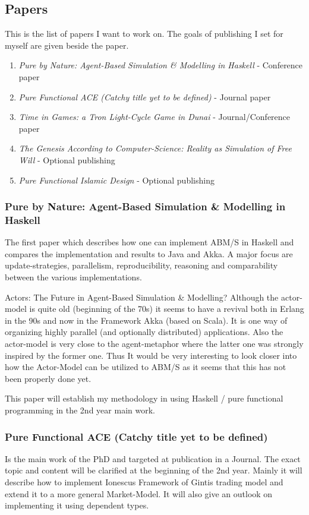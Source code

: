 \subsection{Papers}
This is the list of papers I want to work on. The goals of publishing I set for myself are given beside the paper.

\begin{enumerate}
\item \textit{Pure by Nature: Agent-Based Simulation \& Modelling in Haskell} - Conference paper
\item \textit{Pure Functional ACE (Catchy title yet to be defined)} - Journal paper
\item \textit{Time in Games: a Tron Light-Cycle Game in Dunai} - Journal/Conference paper
\item \textit{The Genesis According to Computer-Science: Reality as Simulation of Free Will} - Optional publishing
\item \textit{Pure Functional Islamic Design} - Optional publishing
\end{enumerate}

\subsubsection{Pure by Nature: Agent-Based Simulation \& Modelling in Haskell}
The first paper which describes how one can implement ABM/S in Haskell and compares the implementation and results to Java and Akka. A major focus are update-strategies, parallelism, reproducibility, reasoning and comparability between the various implementations. 

Actors: The Future in Agent-Based Simulation \& Modelling?
Although the actor-model is quite old (beginning of the 70s) it seems to have a revival both in Erlang in the 90s and now in the Framework Akka (based on Scala). It is one way of organizing highly parallel (and optionally distributed) applications. Also the actor-model is very close to the agent-metaphor where the latter one was strongly inspired by the former one. Thus It would be very interesting to look closer into how the Actor-Model can be utilized to ABM/S as it seems that this has not been properly done yet.

This paper will establish my methodology in using Haskell / pure functional programming in the 2nd year main work.

\subsubsection{Pure Functional ACE (Catchy title yet to be defined)}
Is the main work of the PhD and targeted at publication in a Journal. The exact topic and content will be clarified at the beginning of the 2nd year. Mainly it will describe how to implement Ionescus Framework of Gintis trading model and extend it to a more general Market-Model. It will also give an outlook on implementing it using dependent types.

